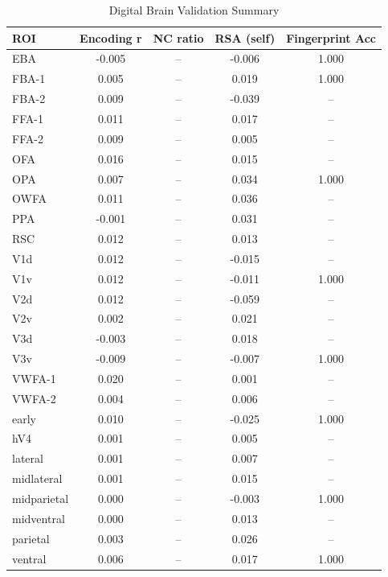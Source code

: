 \begin{table}[h]
\centering
\caption{Digital Brain Validation Summary}
\begin{tabular}{lcccc}
\hline
ROI & Encoding r & NC ratio & RSA (self) & Fingerprint Acc \\
\hline
EBA & -0.005 & -- & -0.006 & 1.000 \\
FBA-1 & 0.005 & -- & 0.019 & 1.000 \\
FBA-2 & 0.009 & -- & -0.039 & -- \\
FFA-1 & 0.011 & -- & 0.017 & -- \\
FFA-2 & 0.009 & -- & 0.005 & -- \\
OFA & 0.016 & -- & 0.015 & -- \\
OPA & 0.007 & -- & 0.034 & 1.000 \\
OWFA & 0.011 & -- & 0.036 & -- \\
PPA & -0.001 & -- & 0.031 & -- \\
RSC & 0.012 & -- & 0.013 & -- \\
V1d & 0.012 & -- & -0.015 & -- \\
V1v & 0.012 & -- & -0.011 & 1.000 \\
V2d & 0.012 & -- & -0.059 & -- \\
V2v & 0.002 & -- & 0.021 & -- \\
V3d & -0.003 & -- & 0.018 & -- \\
V3v & -0.009 & -- & -0.007 & 1.000 \\
VWFA-1 & 0.020 & -- & 0.001 & -- \\
VWFA-2 & 0.004 & -- & 0.006 & -- \\
early & 0.010 & -- & -0.025 & 1.000 \\
hV4 & 0.001 & -- & 0.005 & -- \\
lateral & 0.001 & -- & 0.007 & -- \\
midlateral & 0.001 & -- & 0.015 & -- \\
midparietal & 0.000 & -- & -0.003 & 1.000 \\
midventral & 0.000 & -- & 0.013 & -- \\
parietal & 0.003 & -- & 0.026 & -- \\
ventral & 0.006 & -- & 0.017 & 1.000 \\
\hline
\end{tabular}
\end{table}